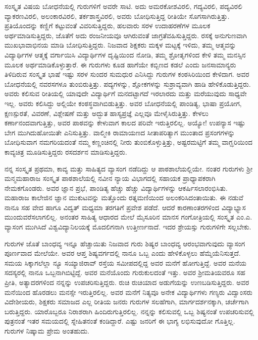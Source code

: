 {ಸಂಸ್ಕೃತ ವಿಷಯ ಬೋಧನೆಯಲ್ಲಿ ಗುರುಗಳಿಗೆ ಅವರೇ ಸಾಟಿ. ಅದು ಅಮರಕೋಶವಿರಲಿ, ಗದ್ಯವಿರಲಿ, ಪದ್ಯವಿರಲಿ ವ್ಯಾಕರಣವಿರಲಿ, ಅಲಂಕಾರವಿರಲಿ, ತರ್ಕಶಾಸ್ತ್ರವಿರಲಿ, ಅವರು ಬೋಧಿಸುತ್ತಿದ್ದ ರೀತಿಯೇ ಸೊಗಸಾಗಿರುತ್ತಿತ್ತು. ಪ್ರತಿಯೊಂದನ್ನು ಕಣ್ಣಿಗೆ ಕಟ್ಟುವಂತೆ ವಿವರಿಸುತ್ತಿದ್ದರು, ಹಲವಾರು ಸರಳ ಉದಾಹರಣೆಗಳ ಮೂಲಕ ಅರ್ಥಮಾಡಿಸುತ್ತಿದ್ದರು, ಜೊತೆಗೆ ಅದು ರಂಜನೀಯವೂ ಆಗಿರುವಂತೆ ಜಾಗ್ರತೆವಹಿಸುತ್ತಿದ್ದರು. ರಸಕ್ಕೆ ಅನುಗುಣವಾಗಿ ಮುಖಭಾವಾಭಿನಯ ಮಾಡಿ ಬೋಧಿಸುತ್ತಿದ್ದರು. ನಿಜವಾದ ಶಿಕ್ಷಕರು ಮಕ್ಕಳ ಮಟ್ಟಕ್ಕೆ ಇಳಿದು, ತಮ್ಮ ಆತ್ಮವನ್ನು ವಿದ್ಯಾರ್ಥಿಗಳ ಆತ್ಮಕ್ಕೆ ವರ್ಗಾಯಿಸಿ ವಿದ್ಯಾರ್ಥಿಗಳ ದೃಷ್ಟಿಯಿಂದ ನೋಡಿ, ತಮ್ಮ ಶ್ರೋತೃಗಳಿಂದ ಕೇಳಿ ತಮ್ಮ ಮನಸ್ಸಿನ ಮೂಲಕ ಅರ್ಥಮಾಡಿಕೊಳ್ಳುತ್ತಾರೆ. ಈ ಗುರುಗಳು ಕೂಡ ಹಾಗೆಯೇ ಕಬ್ಬಿಣದ ಕಡಲೆ ಎಂದು ಜನಸಾಮಾನ್ಯರು ತಿಳಿದಿರುವ ಸಂಸ್ಕೃತ ಭಾಷೆ ಇಷ್ಟು ಸರಳ ಸುಂದರ ಸುಮಧುರ ಎನಿಸಿದ್ದು ಗುರುಗಳ ಕಂಠಸಿರಿಯಿಂದ ಕೇಳಿದಾಗ. ಅವರ ಬೋಧನೆಯಲ್ಲಿ ನವರಸಗಳೂ ತುಂಬಿರುತ್ತಿತ್ತು. ಪದ್ಯಗಳನ್ನು, ಶ್ಲೋಕಗಳನ್ನು ಸುಶ್ರಾವ್ಯವಾಗಿ ಹಾಡಿ ಹೇಳಿಕೊಡುತ್ತಿದ್ದರು. ಅವರು ಕಲಿಸುವ ರೀತಿಯಲ್ಲಿ ಯಾವುದೇ ವಿದ್ಯಾರ್ಥಿಗೆ ಮನದಟ್ಟಾಗದೆ ಇರಲಾರದು ಮತ್ತು ಮರೆಯುವುದು ಸಾಧ್ಯವೇ ಇಲ್ಲ. ಅವರು ಕಲಿಸಿದ್ದು ಅಲ್ಲಿಯೇ ಕಂಠಸ್ಥವಾಗಿಬಿಡುತ್ತಿತ್ತು. ಅವರ ಬೋಧನೆಯಲ್ಲಿ ಪಾಂಡಿತ್ಯ, ಭಾಷಾ ಪ್ರಯೋಗ, ಕ್ಷಣಸ್ಪುರತೆ, ವಿವರಣೆ, ವಿಶ್ಲೇಷಣೆ ಮತ್ತು ಅದ್ಭುತ ಹಾಸ್ಯಪ್ರಜ್ಞೆ ಎಲ್ಲವೂ ಮೇಳೈಸಿರುತ್ತಿತ್ತು. ಕೇಳಲು ಕರ್ಣಾನಂದವಾಗುತ್ತಿತ್ತು, ಅವರ ಪಾಠವನ್ನು ಕೇಳುವಾಗ ಕಾಲದ ಪರಿವೇ ಇರುತ್ತಿರಲಿಲ್ಲ. ಅಯ್ಯೋ! ಉಪನ್ಯಾಸ ಇಷ್ಟು ಬೇಗ ಮುಗಿದುಹೋಯಿತೇ ಎನಿಸುತ್ತಿತ್ತು. ವಾಲ್ಮೀಕಿ ರಾಮಾಯಣದ ಸೀತಾಪರಿತ್ಯಾಗ ಮುಂತಾದ ಪ್ರಸಂಗಗಳನ್ನು ಬೋಧಿಸುವಾಗ ನಮಗರಿಯದಂತೆ ನಮ್ಮ ಕಣ್ಣಂಚಿನಲ್ಲಿ ನೀರು ತುಂಬಿಕೊಳ್ಳುತ್ತಿತ್ತು, ಅಷ್ಟರಮಟ್ಟಿಗೆ ತಮ್ಮ ವಾಗ್ಝರಿಯಿಂದ ಕಾವ್ಯಚಿತ್ರ ಮೂಡಿಸುತ್ತಿದ್ದರು ರಸದರ್ಶನ ಮಾಡಿಸುತ್ತಿದ್ದರು.

ನನ್ನ ಸಂಸ್ಕೃತ ಪ್ರಥಮಾ, ಕಾವ್ಯ ಮತ್ತು ಸಾಹಿತ್ಯದ ವ್ಯಾಸಂಗ ನಡೆದಿದ್ದು ಆ ಪಾಠಶಾಲೆಯಲ್ಲಿಯೇ. ನಂತರ ಗುರುಗಳು ಶ್ರೀ ಮನ್ಮಮಹಾರಾಜ ಸಂಸ್ಕೃತ ಪಾಠಶಾಲೆಯಲ್ಲಿ ನವೀನ ನ್ಯಾಯ ವಿಭಾಗದಲ್ಲಿ ಸಹಾಯಕ ಪ್ರಾಧ್ಯಾಪಕರಾಗಿ ನೇಮಕಗೊಂಡರು. ಅವರ ಜ್ಞಾನ ಪ್ರಭೆ, ಪಾಂಡಿತ್ಯ ಹೆಚ್ಚು ಹೆಚ್ಚು ವಿದ್ಯಾರ್ಥಿಗಳನ್ನು ಆಕರ್ಷಿಸಲಾರಂಭಿಸಿತು. ಮಹಾರಾಜ ಕಾಲೇಜಿನ ಜ್ಞಾನ ಮುಕುಟವನ್ನು ಮತ್ತೊಂದು ರತ್ನಮಣಿಯಿಂದ ಅಲಂಕರಿಸಿದಂತಾಯಿತು. ಈ ನಡುವೆ ನಾನೂ ಸಹ ವೇದ ಹಾಗೂ ವಿದ್ವತ್ ಮಧ್ಯಮಾ ತರಗತಿಗೆ ಪ್ರವೇಶ ಪಡೆದೆ. ಆದರೆ ಕಾರಣಾಂತರಗಳಿಂದ ವಿದ್ಯಾಭ್ಯಾಸ ಮುಂದುವರೆಸಲಾಗಲಿಲ್ಲ. ಅನಂತರ ಸಾಹಿತ್ಯ ಆಧಾರದ ಮೇಲೆ ಮೈಸೂರಿನ ಮಾನಸ ಗಂಗೋತ್ರಿಯಲ್ಲಿ ಸಂಸ್ಕೃತ ಎಂ.ಎ. ವ್ಯಾಸಂಗ ಮುಗಿಸಿದೆ ವಿಶ್ವವಿದ್ಯಾನಿಲಯಕ್ಕೆ ಮೊದಲಿಗನಾಗಿ ಉತ್ತೀರ್ಣನಾದೆ. ಇದರ ಶ್ರೇಯಸ್ಸು ಗುರುಗಳಿಗೇ ಸಲ್ಲಬೇಕು.

ಗುರುಗಳ ಜೊತೆ ಬಾಂಧವ್ಯ ಇನ್ನೂ ಹೆಚ್ಚಾಯಿತು ನಿಜವಾದ ಗುರು  \enginline{-}  ಶಿಷ್ಯರ ಬಾಂಧವ್ಯ ಆರಂಭವಾಗುವುದು ವ್ಯಾಸಂಗ ಪೂರ್ಣವಾದ ಮೇಲೆಯೇ. ಅವರ ಆಪ್ತ ಶಿಷ್ಯವರ್ಗದಲ್ಲಿ ನಾನೂ ಒಬ್ಬ ಎಂದು ಹೇಳಿಕೊಳ್ಳಲು ಹೆಮ್ಮೆಯೆನಿಸುತ್ತದೆ. ಸಮಯ ಸಿಕ್ಕಾಗಲೆಲ್ಲಾ ನ್ಯೂ ಸಯ್ಯಾಜಿರಾವ್ ರಸ್ತೆಯ ಸಮೀಪದಲ್ಲಿದ್ದ ಅವರ ಮನೆಗೆ ಹೋಗುತ್ತಿದ್ದೆ. ಅವರ ಮನೆಯ ಸದಸ್ಯರಲ್ಲಿ ನಾನೂ ಒಬ್ಬನಾಗಿಬಿಟ್ಟಿದ್ದೆ. ಅವರ ಮನೆಯೊಂದು ಗುರುಕುಲದಂತೆ ಇತ್ತು. ಅವರ ಶ್ರೀಮತಿಯವರೂ ಸಹ ಪ್ರೀತಿ, ಅತ್ಯಾದರಗಳಿಂದ ನನ್ನನ್ನು ಉಪಚರಿಸುತ್ತಿದ್ದರು. ರುಚಿ ರುಚಿಯಾದ ಅಡುಗೆಯನ್ನು ಉಣಬಡಿಸುತ್ತಿದ್ದರು. ಅವರ ಮನೆಯಿಂದ ಹೊರಡಲು ಮನಸ್ಸೇ ಇರುತ್ತಿರಲಿಲ್ಲ. ಅವರ ಮನೆಗೆ ನಿತ್ಯವೂ ಅನೇಕ ವಿದ್ಯಾರ್ಥಿಗಳು ಗಣ್ಯರು ವಿದ್ವಾಂಸರು ವಿದೇಶೀಯರು, ಶಿಕ್ಷಕರು ಸಮಾಜದ ಎಲ್ಲ ರೀತಿಯ ಜನರು ಗುರುಗಳ ಸಲಹೆಗಾಗಿ, ಮಾರ್ಗದರ್ಶನಕ್ಕಾಗಿ, ಚರ್ಚೆಗಾಗಿ ಬರುತ್ತಿದ್ದರು. ಯಾರೊಬ್ಬರೂ ನಿರಾಶರಾಗಿ ಹಿಂದಿರುಗುತ್ತಿರಲಿಲ್ಲ. ನನ್ನನ್ನು ಕಲಿಸುವಲ್ಲಿ ಒಬ್ಬ ಶಿಷ್ಯನಂತೆ ಉಪಚರಿಸುವಲ್ಲಿ ಪುತ್ರನಂತೆ ಇತರ ಸಮಯದಲ್ಲಿ ಸ್ನೇಹಿತನಂತೆ ಕಂಡಿದ್ದಾರೆ. ಎಷ್ಟು ಜನರಿಗೆ ಈ ಭಾಗ್ಯ ಲಭಿಸುವುದೋ ಗೊತ್ತಿಲ್ಲ. ಗುರುಗಳ ನಿಷ್ಕಾಮ ಪ್ರೇಮ ಅಂತಹುದು.

}
